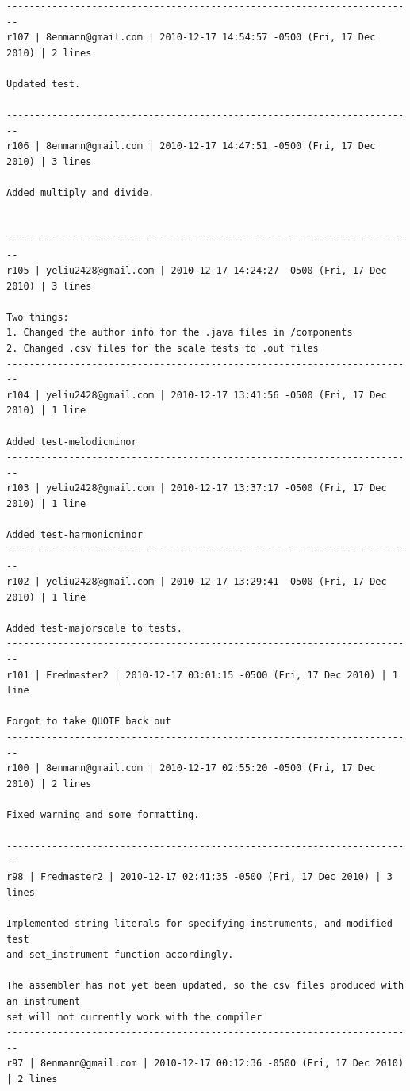 \documentclass[12pt,A4]{book}
\begin{document}
\begin{verbatim}
------------------------------------------------------------------------
r107 | 8enmann@gmail.com | 2010-12-17 14:54:57 -0500 (Fri, 17 Dec 2010) | 2 lines

Updated test.

------------------------------------------------------------------------
r106 | 8enmann@gmail.com | 2010-12-17 14:47:51 -0500 (Fri, 17 Dec 2010) | 3 lines

Added multiply and divide.


------------------------------------------------------------------------
r105 | yeliu2428@gmail.com | 2010-12-17 14:24:27 -0500 (Fri, 17 Dec 2010) | 3 lines

Two things:
1. Changed the author info for the .java files in /components
2. Changed .csv files for the scale tests to .out files
------------------------------------------------------------------------
r104 | yeliu2428@gmail.com | 2010-12-17 13:41:56 -0500 (Fri, 17 Dec 2010) | 1 line

Added test-melodicminor
------------------------------------------------------------------------
r103 | yeliu2428@gmail.com | 2010-12-17 13:37:17 -0500 (Fri, 17 Dec 2010) | 1 line

Added test-harmonicminor
------------------------------------------------------------------------
r102 | yeliu2428@gmail.com | 2010-12-17 13:29:41 -0500 (Fri, 17 Dec 2010) | 1 line

Added test-majorscale to tests.
------------------------------------------------------------------------
r101 | Fredmaster2 | 2010-12-17 03:01:15 -0500 (Fri, 17 Dec 2010) | 1 line

Forgot to take QUOTE back out
------------------------------------------------------------------------
r100 | 8enmann@gmail.com | 2010-12-17 02:55:20 -0500 (Fri, 17 Dec 2010) | 2 lines

Fixed warning and some formatting.

------------------------------------------------------------------------
r98 | Fredmaster2 | 2010-12-17 02:41:35 -0500 (Fri, 17 Dec 2010) | 3 lines

Implemented string literals for specifying instruments, and modified test 
and set_instrument function accordingly.

The assembler has not yet been updated, so the csv files produced with an instrument 
set will not currently work with the compiler
------------------------------------------------------------------------
r97 | 8enmann@gmail.com | 2010-12-17 00:12:36 -0500 (Fri, 17 Dec 2010) | 2 lines


\end{verbatim}
\end{document}
